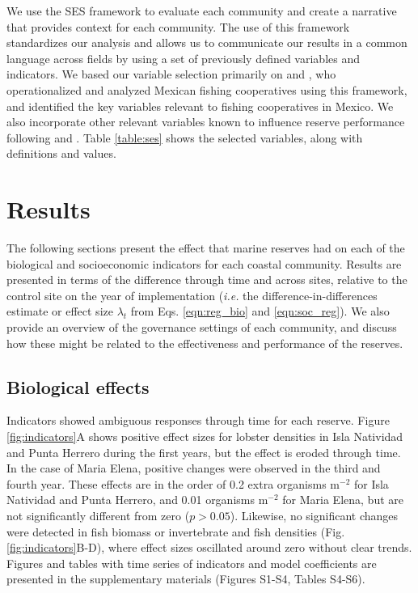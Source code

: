 \documentclass{frontiersSCNS}
\begin{document}
We use the SES framework to evaluate each community and create a
narrative that provides context for each community. The use of this
framework standardizes our analysis and allows us to communicate our
results in a common language across fields by using a set of previously
defined variables and indicators. We based our variable selection
primarily on \citet{leslie_2015-na} and \citet{basurto_2013-oq}, who
operationalized and analyzed Mexican fishing cooperatives using this
framework, and identified the key variables relevant to fishing
cooperatives in Mexico. We also incorporate other relevant variables
known to influence reserve performance following
\citet{difranco_2016-Xw} and \citet{edgar_2014-UO}. Table
\ref{table:ses} shows the selected variables, along with definitions and
values.

\hypertarget{results}{%
\section{Results}\label{results}}

The following sections present the effect that marine reserves had on
each of the biological and socioeconomic indicators for each coastal
community. Results are presented in terms of the difference through time
and across sites, relative to the control site on the year of
implementation (\emph{i.e.} the difference-in-differences estimate or
effect size \(\lambda_t\) from Eqs. \ref{eqn:reg_bio} and
\ref{eqn:soc_reg}). We also provide an overview of the governance
settings of each community, and discuss how these might be related to
the effectiveness and performance of the reserves.

\hypertarget{biological-effects}{%
\subsection{Biological effects}\label{biological-effects}}

Indicators showed ambiguous responses through time for each reserve.
Figure \ref{fig:indicators}A shows positive effect sizes for lobster
densities in Isla Natividad and Punta Herrero during the first years,
but the effect is eroded through time. In the case of Maria Elena,
positive changes were observed in the third and fourth year. These
effects are in the order of 0.2 extra organisms \(\mathrm{m}^{-2}\) for
Isla Natividad and Punta Herrero, and 0.01 organisms \(\mathrm{m}^{-2}\)
for Maria Elena, but are not significantly different from zero
(\(p > 0.05\)). Likewise, no significant changes were detected in fish
biomass or invertebrate and fish densities (Fig.
\ref{fig:indicators}B-D), where effect sizes oscillated around zero
without clear trends. Figures and tables with time series of indicators
and model coefficients are presented in the supplementary materials
(Figures S1-S4, Tables S4-S6).
\end{document}
